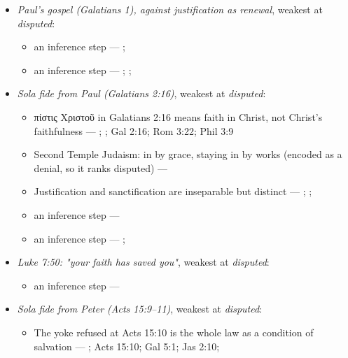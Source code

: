 \documentclass[11pt]{article}
\begin{document}
\begin{itemize}
\item \emph{Paul's gospel (Galatians 1), against justification as renewal}, weakest at \emph{disputed}:
\begin{itemize}
\item an inference step --- \cite[ad loc. Gal 1:6]{moo-galatians-2013}; \cite[XI.1]{westminster-confession-1647}
\item an inference step --- \cite[XI.1]{westminster-confession-1647}; \cite[III.xi.2]{calvin-institutes-1960}; \cite{morris-apostolic-preaching-1965}
\end{itemize}
\item \emph{Sola fide from Paul (Galatians 2:16)}, weakest at \emph{disputed}:
\begin{itemize}
\item πίστις Χριστοῦ in Galatians 2:16 means faith in Christ, not Christ's faithfulness --- \cite{dunn-once-more-pistis-christou-1991}; \cite{matlock-detheologizing-2000}; Gal 2:16; Rom 3:22; Phil 3:9
\item Second Temple Judaism: in by grace, staying in by works (encoded as a denial, so it ranks disputed) --- \cite{sanders-paul-palestinian-judaism-1977}
\item Justification and sanctification are inseparable but distinct --- \cite[XIII.1]{westminster-confession-1647}; \cite[XI.1]{westminster-confession-1647}; \cite[III.xi.6]{calvin-institutes-1960}
\item an inference step --- \cite[Trent, Session VI (1547), canon 9]{tanner-decrees-1990}
\item an inference step --- \cite{gathercole-where-boasting-2002}; \cite{carson-variegated-nomism-1-2001}
\end{itemize}
\item \emph{Luke 7:50: "your faith has saved you"}, weakest at \emph{disputed}:
\begin{itemize}
\item an inference step --- \cite[Trent, Session VI (1547), canon 9]{tanner-decrees-1990}
\end{itemize}
\item \emph{Sola fide from Peter (Acts 15:9–11)}, weakest at \emph{disputed}:
\begin{itemize}
\item The yoke refused at Acts 15:10 is the whole law as a condition of salvation --- \cite[ad loc. Acts 15:10]{bruce-acts-1988}; Acts 15:10; Gal 5:1; Jas 2:10; \cite{das-paul-law-covenant-2001}

\end{itemize}
\end{itemize}
\end{document}
